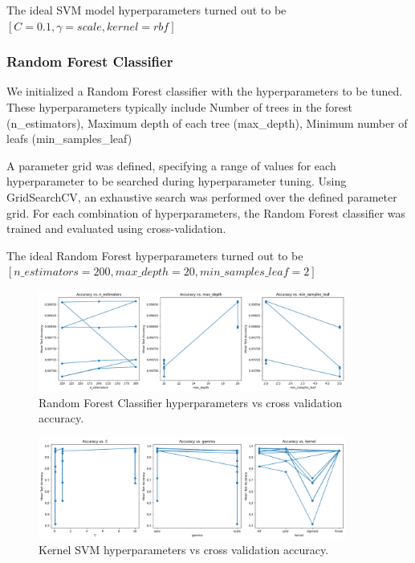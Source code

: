 \documentclass{article}
\begin{document}
The ideal SVM model hyperparameters turned out to be \([C = 0.1, \gamma = \textit{scale}, kernel = \textit{rbf}]\)

\subsubsection{Random Forest Classifier}

We initialized a Random Forest classifier with the hyperparameters to be tuned. These hyperparameters typically include Number of trees in the forest (n\_estimators), Maximum depth of each tree (max\_depth), Minimum number of leafs (min\_samples\_leaf)

A parameter grid was defined, specifying a range of values for each hyperparameter to be searched during hyperparameter tuning. Using GridSearchCV, an exhaustive search was performed over the defined parameter grid. For each combination of hyperparameters, the Random Forest classifier was trained and evaluated using cross-validation. 

The ideal Random Forest hyperparameters turned out to be \([n\_estimators = 200, max\_depth = 20, min\_samples\_leaf = 2]\)

\begin{figure}[h]
  \centering
  \includegraphics[width=0.9\textwidth]{rfc.png}
  \caption[short]{Random Forest Classifier hyperparameters vs cross validation accuracy.}
\end{figure}

\begin{figure}[h]
  \centering
  \includegraphics[width=0.9\textwidth]{svm_kernel.png}
  \caption[short]{Kernel SVM hyperparameters vs cross validation accuracy.}
\end{figure}
\end{document}

